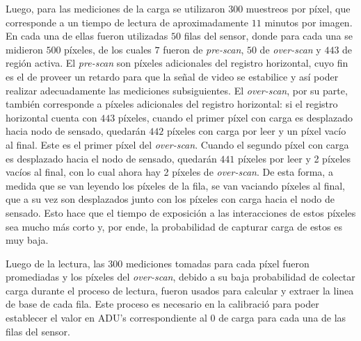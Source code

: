 Luego, para las mediciones de la carga se utilizaron $300$ muestreos por píxel, que corresponde a un tiempo de lectura de aproximadamente $11$ minutos por imagen. En cada una de ellas fueron utilizadas $50$ filas del sensor, donde para cada una se midieron $500$ píxeles, de los cuales $7$ fueron de \textit{pre-scan}, $50$ de \textit{over-scan} y $443$ de región activa. El \textit{pre-scan} son píxeles adicionales del registro horizontal, cuyo fin es el de proveer un retardo para que la señal de video se estabilice y así poder realizar adecuadamente las mediciones subsiguientes. El \textit{over-scan}, por su parte, también corresponde a píxeles adicionales del registro horizontal: si el registro horizontal cuenta con $443$ píxeles, cuando el primer píxel con carga es desplazado hacia nodo de sensado, quedarán $442$ píxeles con carga por leer y un píxel vacío al final. Este es el primer píxel del \textit{over-scan}. Cuando el segundo píxel con carga es desplazado hacia el nodo de sensado, quedarán $441$ píxeles por leer y 2 píxeles vacíos al final, con lo cual ahora hay 2 píxeles de \textit{over-scan}. De esta forma, a medida que se van leyendo los píxeles de la fila, se van vaciando píxeles al final, que a su vez son desplazados junto con los píxeles con carga hacia el nodo de sensado. Esto hace que el tiempo de exposición a las interacciones de estos píxeles sea mucho más corto y, por ende, la probabilidad de capturar carga de estos es muy baja. 


Luego de la lectura, las $300$ mediciones tomadas para cada píxel fueron promediadas y los píxeles del \textit{over-scan}, debido a su baja probabilidad de colectar carga durante el proceso de lectura, fueron usados para calcular y extraer la linea de base de cada fila. Este proceso es necesario en la calibració para poder establecer el valor en ADU's correspondiente al $0$ de carga para cada una de las filas del sensor. 


